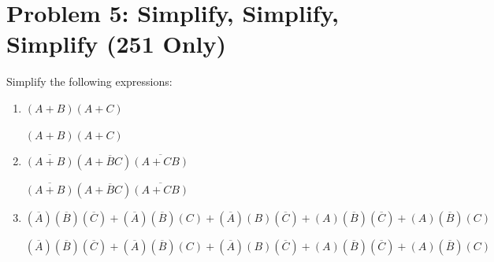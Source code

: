 \section*{Problem 5: Simplify, Simplify, Simplify (251 Only)}
Simplify the following expressions:

\begin{enumerate}[label=(\alph*)]
\item $(A + B)(A + C)$

\begin{solution}
$(A + B)(A + C)$
\end{solution}

\item $\overline{(A + B)}(A + \overline{B}C)\overline{(A + CB)}$

\begin{solution}
$\overline{(A + B)}(A + \overline{B}C)\overline{(A + CB)}$
\end{solution}

\item $(\overline{A})(\overline{B})(\overline{C}) + (\overline{A})(\overline{B})(C) + (\overline{A})(B)(\overline{C}) + (A)(\overline{B})(\overline{C}) + (A)(\overline{B})(C)$

\begin{solution}
$(\overline{A})(\overline{B})(\overline{C}) + (\overline{A})(\overline{B})(C) + (\overline{A})(B)(\overline{C}) + (A)(\overline{B})(\overline{C}) + (A)(\overline{B})(C)$
\end{solution}

\end{enumerate}


